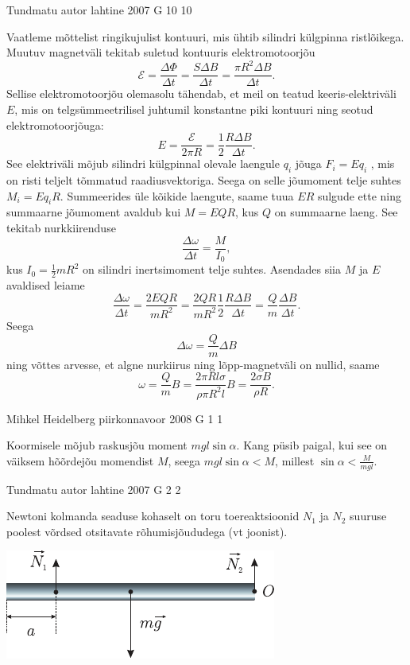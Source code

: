 \documentclass[11pt, twoside]{article}
\begin{document}
{%
{Tundmatu autor} %
{lahtine} %
{2007} %
{G 10} %
{10} %
{

\ifSolution
Vaatleme mõttelist ringikujulist kontuuri, mis ühtib silindri külgpinna ristlõikega. Muutuv magnetväli tekitab suletud kontuuris elektromotoorjõu
\[
\mathcal{E}=\frac{\Delta \Phi}{\Delta t}=\frac{S \Delta B}{\Delta t}=\frac{\pi R^{2} \Delta B}{\Delta t}.
\]
Sellise elektromotoorjõu olemasolu tähendab, et meil on teatud keeris-elektriväli $E$, mis on telgsümmeetrilisel juhtumil konstantne piki kontuuri ning seotud elektromotoorjõuga:
\[
E=\frac{\mathcal{E}}{2 \pi R}=\frac{1}{2} \frac{R \Delta B}{\Delta t}.
\]
See elektriväli mõjub silindri külgpinnal olevale laengule $q_i$ jõuga $F_i = Eq_i$ , mis on risti teljelt tõmmatud raadiusvektoriga. Seega on selle jõumoment telje suhtes $M_i = Eq_iR$. Summeerides üle kõikide laengute, saame tuua $ER$ sulgude ette ning summaarne jõumoment avaldub kui $M = EQR$, kus $Q$ on summaarne laeng. See tekitab nurkkiirenduse
\[
\frac{\Delta \omega}{\Delta t}=\frac{M}{I_{0}},
\]
kus $I_0 = \frac{1}{2}mR^2$ on silindri inertsimoment telje suhtes. Asendades siia $M$ ja $E$ avaldised leiame
\[
\frac{\Delta \omega}{\Delta t}=\frac{2 E Q R}{m R^{2}}=\frac{2 Q R}{m R^{2}} \frac{1}{2} \frac{R \Delta B}{\Delta t}=\frac{Q}{m} \frac{\Delta B}{\Delta t}.
\]
Seega
\[
\Delta \omega=\frac{Q}{m} \Delta B
\]
ning võttes arvesse, et algne nurkiirus ning lõpp-magnetväli on nullid, saame
\[
\omega=\frac{Q}{m} B=\frac{2 \pi R l \sigma}{\rho \pi R^{2} l} B=\frac{2 \sigma B}{\rho R}.
\]
\fi
}

{Mihkel Heidelberg} %
{piirkonnavoor} %
{2008} %
{G 1} %
{1} %
{

\ifSolution
Koormisele mõjub raskusjõu moment $mgl\sin \alpha$. Kang püsib paigal, kui see on väiksem hõõrdejõu momendist $M$, seega $mgl\sin \alpha < M$, millest $\sin \alpha < \frac{M}{mgl}$.
\fi
}

{Tundmatu autor} %
{lahtine} %
{2007} %
{G 2} %
{2} %
{

\ifSolution
Newtoni kolmanda seaduse kohaselt on toru toereaktsioonid $N_1$ ja $N_2$ suuruse poolest võrdsed otsitavate rõhumisjõududega (vt joonist).

\begin{center}
	\includegraphics[width=0.6\linewidth]{2007-lahg-02-lah}
\end{center}

}}
\end{document}
